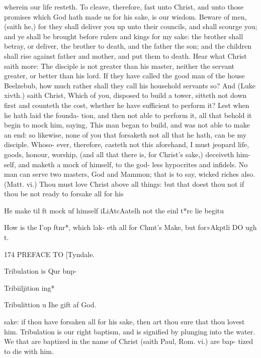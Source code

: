 \documentclass{custom}
\begin{document}
wherein our life resteth. To cleave, therefore, 
fast unto Christ, and unto those promises which 
God hath made us for his sake, is our wisdom. 
Beware of men, (saith he,) for they shall deliver 
you up unto their councils, and shall scourge 
you; and ye shall be brought before rulers and 
kings for my sake: the brother shall betray, or 
deliver, the brother to death, and the father the 
son; and the children shall rise against father 
and mother, and put them to death. Hear what 
Christ saith more: The disciple is not greater 
than his master, neither the servant greater, or 
better than his lord. If they have called the 
good man of the house Beelzebub, how much 
rather shall they call his household servants so? 
And (Luke xivth.) saith Christ, Which of you, 
disposed to build a tower, sitteth not down first 
and counteth the cost, whether he have sufficient 
to perform it? Lest when he hath laid the founda- 
tion, and then not able to perform it, all that 
behold it begin to mock him, saying, This man 
began to build, and was not able to make an 
end: so likewise, none of you that forsaketh not 
all that he hath, can be my disciple. Whoso- 
ever, therefore, casteth not this aforehand, I must 
jeopard life, goods, honour, worship, (and all 
that there is, for Christ's sake,) deceiveth him- 
self, and maketh a mock of himself, to the god- 
less hypocrites and infidels. No man can serve 
two masters, God and Mammon; that is to say, 
wicked riches also. (Matt. vi.) Thou must love 
Christ above all things: but that doest thou 
not if thou be not ready to forsake all for his 


He make til 
ft mock uf 
himself 
iLiAtcAatelh 
not the einl 
t*rc lie 
begitu 



How is the 
I'op ftnr*, 
which lak- 
eth all for 
Chmt's 
Make, but 
for»Akptli 
DO ugh t. 



174 
PREFACE TO 
[Tyndale.



Tribulation 
is Qur bnp- 



Tribiiljition 
ing* 






Tribulittion 
u Ihe gift 
af God. 



sake: if thou have forsaken all for his sake, then 
art thou sure that thou lovest him. Tribulation
is our right baptism, and is signified by plunging 
into the water. We that are baptized in the 
name of Christ (saith Paul, Rom. vi.) are bap-
tized to die with him. 
\end{document}
